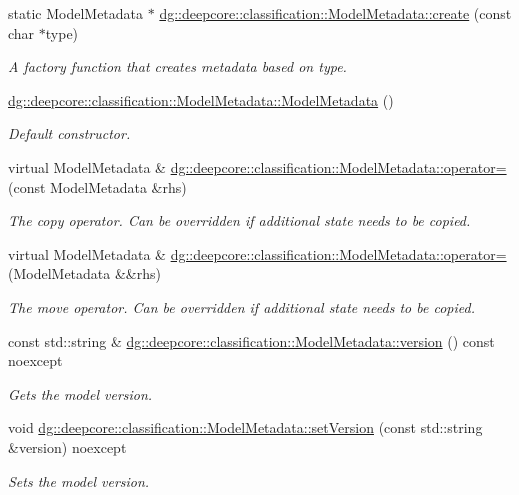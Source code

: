 \begin{DoxyCompactItemize}
static Model\+Metadata $\ast$ \hyperlink{group___classification_module_gaefd1b5db6a78f7fae50f1ec637672c67}{dg\+::deepcore\+::classification\+::\+Model\+Metadata\+::create} (const char $\ast$type)
\begin{DoxyCompactList}\small\item\em A factory function that creates metadata based on type. \end{DoxyCompactList}\item 
\hyperlink{group___classification_module_ga839013c5b7cbf03571fd141fbb0620b4}{dg\+::deepcore\+::classification\+::\+Model\+Metadata\+::\+Model\+Metadata} ()
\begin{DoxyCompactList}\small\item\em Default constructor. \end{DoxyCompactList}\item 
virtual Model\+Metadata \& \hyperlink{group___classification_module_gac896bd743678834ed3b9fa036030c739}{dg\+::deepcore\+::classification\+::\+Model\+Metadata\+::operator=} (const Model\+Metadata \&rhs)
\begin{DoxyCompactList}\small\item\em The copy operator. Can be overridden if additional state needs to be copied. \end{DoxyCompactList}\item 
virtual Model\+Metadata \& \hyperlink{group___classification_module_ga5f6229dc9ebfe42df3729cfc76d593cf}{dg\+::deepcore\+::classification\+::\+Model\+Metadata\+::operator=} (Model\+Metadata \&\&rhs)
\begin{DoxyCompactList}\small\item\em The move operator. Can be overridden if additional state needs to be copied. \end{DoxyCompactList}\item 
const std\+::string \& \hyperlink{group___classification_module_ga496e4c5294b5438ff17456c9e9ab2c05}{dg\+::deepcore\+::classification\+::\+Model\+Metadata\+::version} () const noexcept
\begin{DoxyCompactList}\small\item\em Gets the model version. \end{DoxyCompactList}\item 
void \hyperlink{group___classification_module_ga0ad36321b38d014d2d2202cb6e4b3605}{dg\+::deepcore\+::classification\+::\+Model\+Metadata\+::set\+Version} (const std\+::string \&version) noexcept
\begin{DoxyCompactList}\small\item\em Sets the model version. \end{DoxyCompactList}\item 

\end{DoxyCompactItemize}
